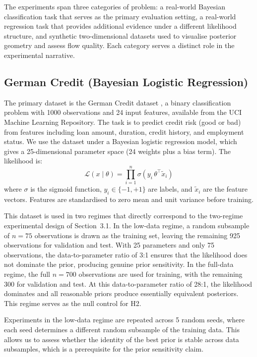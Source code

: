The experiments span three categories of 
problem: a real-world Bayesian classification 
task that serves as the primary evaluation 
setting, a real-world regression task that 
provides additional evidence under a different 
likelihood structure, and synthetic two-dimensional 
datasets used to visualise posterior geometry 
and assess flow quality. Each category serves 
a distinct role in the experimental narrative.

\subsection{German Credit (Bayesian Logistic 
Regression)}

The primary dataset is the German Credit 
dataset \citep{hofmann1994}, a binary classification 
problem with 1000 observations and 24 input 
features, available from the UCI Machine 
Learning Repository. The task is to predict 
credit risk (good or bad) from features 
including loan amount, duration, credit 
history, and employment status. We use the 
dataset under a Bayesian logistic regression 
model, which gives a 25-dimensional parameter 
space (24 weights plus a bias term). The 
likelihood is:
\begin{equation}
    \mathcal{L}(x \mid \theta) = 
    \prod_{i=1}^n \sigma(y_i\, \theta^\top 
    \tilde{x}_i)
\end{equation}
where $\sigma$ is the sigmoid function, 
$y_i \in \{-1, +1\}$ are labels, and 
$\tilde{x}_i$ are the feature vectors. 
Features are standardised to zero mean 
and unit variance before training.

This dataset is used in two regimes that 
directly correspond to the two-regime 
experimental design of Section~3.1. In 
the low-data regime, a random subsample 
of $n = 75$ observations is drawn as the 
training set, leaving the remaining 925 
observations for validation and test. 
With 25 parameters and only 75 observations, 
the data-to-parameter ratio of 3:1 ensures 
that the likelihood does not dominate the 
prior, producing genuine prior sensitivity. 
In the full-data regime, the full $n = 700$ 
observations are used for training, with 
the remaining 300 for validation and test. 
At this data-to-parameter ratio of 28:1, 
the likelihood dominates and all reasonable 
priors produce essentially equivalent 
posteriors. This regime serves as the null 
control for H2.

Experiments in the low-data regime are 
repeated across 5 random seeds, where each 
seed determines a different random subsample 
of the training data. This allows us to 
assess whether the identity of the best 
prior is stable across data subsamples, 
which is a prerequisite for the prior 
sensitivity claim.

